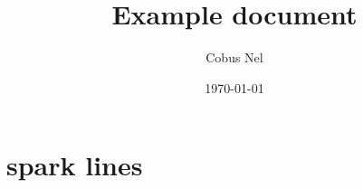 \documentclass[12pt, a4paper]{article}
\title{Example document}
\author{Cobus Nel}
\date{\today}
\begin{document}
\section{spark lines}

\end{document}

